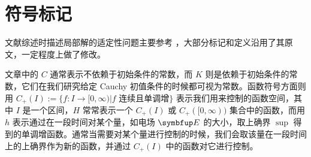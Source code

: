   
  
  
  
  
  
  
\section{符号标记}

文献综述时描述局部解的适定性问题主要参考 \cite*{HorstClasssicalI}，大部分标记和定义沿用了其原文，一定程度上做了修改。

文章中的 $C$ 通常表示不依赖于初始条件的常数，而 $K$ 则是依赖于初始条件的常数，它们在我们研究给定 Cauchy 初值条件的时候都可视为常数。函数符号方面则用 $C_+(I):=\{f:I\rightarrow [0,\infty)\bigg| f \text{ 连续且单调增}\}$ 表示我们用来控制的函数空间，其中 $I$ 是一个区间，$H$ 常常表示一个 $C_{+}(I)$ 或 $C_{+}([0,\infty))$ 集合中的函数，而用 $h$ 表示通过在一段时间对某个量，如电场 $\vE$ 的大小，取上确界 $\sup$ 得到的单调增函数。通常当需要对某个量进行控制的时候，我们会取该量在一段时间上的上确界作为新的函数，并通过 $C_+(I)$ 中的函数对它进行控制。

